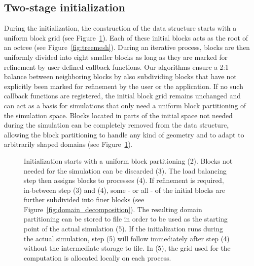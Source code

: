 \documentclass[final,leqno,onefignum,onetabnum]{siamltex1213}
\begin{document}
\subsection{Two-stage initialization}\label{sec:pconcept:init}

During the initialization, the construction of the data structure starts with a uniform block grid (see Figure~\ref{fig:initialization}).
Each of these initial blocks acts as the root of an octree (see Figure~\ref{fig:treemesh}).
During an iterative process, blocks are then uniformly divided into eight smaller blocks as long as they are marked for refinement by user-defined callback functions.
Our algorithms ensure a 2:1 balance between neighboring blocks by also subdividing blocks
that have not explicitly been marked for refinement by the user or the application.
If no such callback functions are registered, the initial block grid remains unchanged and
can act as a basis for simulations that only need a uniform block partitioning of the simulation space.
Blocks located in parts of the initial space not needed during the simulation can be completely removed from the data structure, 
allowing the block partitioning to handle any kind of geometry and to adapt to arbitrarily shaped domains (see Figure~\ref{fig:initialization}).

\begin{figure}[tbp]
  \centering
  \caption{Initialization starts with a uniform block partitioning (2).
Blocks not needed for the simulation can be discarded (3).
The load balancing step then assigns blocks to processes (4).
If refinement is required, in-between step (3) and (4), some - or all - of the initial blocks are further subdivided into finer blocks (see Figure~\ref{fig:domain_decomposition}).
The resulting domain partitioning can be stored to file in order to be used as the starting point of the actual simulation (5).
If the initialization runs during the actual simulation, step (5) will follow immediately after step (4) without the intermediate storage to file.
In (5), the grid used for the computation is allocated locally on each process.}
  \label{fig:initialization}
\end{figure}
\end{document}
